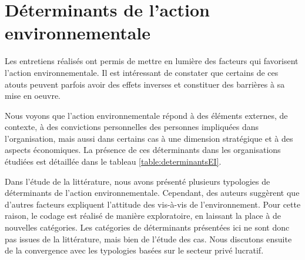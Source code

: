 

\section{Déterminants de l'action environnementale}
\label{section:det_act_env}

Les entretiens réalisés ont permis de mettre en lumière des facteurs qui favorisent l'action environnementale. Il est intéressant de constater que certains de ces atouts peuvent parfois avoir des effets inverses et constituer des barrières à sa mise en oeuvre.

Nous voyons que l'action environnementale répond à des éléments externes, de contexte, à des convictions personnelles des personnes impliquées dans l'organisation, mais aussi dans certains cas à une dimension stratégique et à des aspects économiques. La présence de ces déterminants dans les organisations étudiées est détaillée dans le tableau \ref{table:determinantsEI}.

Dans l'étude de la littérature, nous avons présenté plusieurs typologies de déterminants de l'action environnementale. Cependant, des auteurs \parencite[par exemple][]{dart2010green} suggèrent que d'autres facteurs expliquent l'attitude des \oess  vis-à-vis de l'environnement. Pour cette raison, le codage est réalisé de manière exploratoire, en laissant la place à de nouvelles catégories. Les catégories de déterminants présentées ici ne sont donc pas issues de la littérature, mais bien de l'étude des cas. Nous discutons ensuite de la convergence avec les typologies basées sur le secteur privé lucratif.

